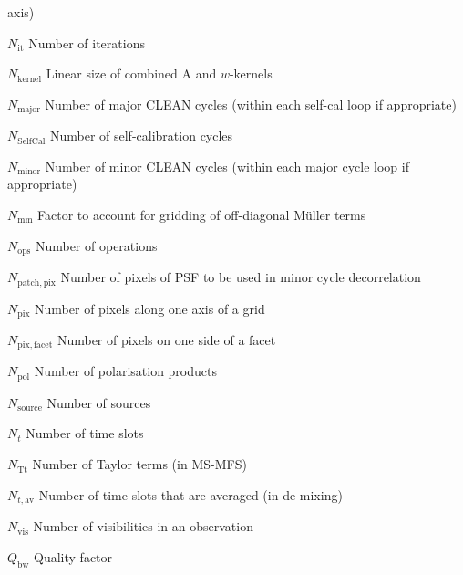 \documentclass[11pt,a4paper]{article}
\newcommand{\nit}{N_\mathrm{it}} %
\newcommand{\nawkern}{N_\mathrm{kernel}} %
\newcommand{\nmaj}{N_\mathrm{major}} %
\newcommand{\nmin}{N_\mathrm{minor}} %
\newcommand{\nselfcal}{N_\mathrm{SelfCal}} %
\newcommand{\facgridoffdiagmuller}{N_\mathrm{mm}} %
\newcommand{\nops}{N_\mathrm{ops}} %
\newcommand{\npatchpix}{N_\mathrm{patch,pix}} %
\newcommand{\npix}{N_\mathrm{pix}} %
\newcommand{\npixfacet}{N_\mathrm{pix,facet}} %
\newcommand{\npol}{N_\mathrm{pol}} %
\newcommand{\ntslot}{N_t} %
\newcommand{\ntaylor}{N_\mathrm{Tt}} %
\newcommand{\ntslotave}{N_{t,\mathrm{av}}} %
\newcommand{\nvis}{N_\mathrm{vis}} %
\newcommand{\qfacbw}{Q_\mathrm{bw}} %
\newcommand{\nsource}{N_\mathrm{source}} %
\newcommand{\w}{w} %
\begin{document}
\begin{basedescript}{\desclabelstyle{\pushlabel}\desclabelwidth{6em}}
  axis) \vspace{-0.2cm}
\item[$\nit$] Number of iterations \vspace{-0.2cm}
\item[$\nawkern$] Linear size of combined A and $\w$-kernels \vspace{-0.2cm}
\item[$\nmaj$] Number of major CLEAN cycles (within each self-cal loop if appropriate) \vspace{-0.2cm}
\item[$\nselfcal$] Number of self-calibration cycles \vspace{-0.2cm}
\item[$\nmin$] Number of minor CLEAN cycles (within each major cycle loop if appropriate)\vspace{-0.2cm}
\item[$\facgridoffdiagmuller$] Factor to account for gridding of off-diagonal
  M\"uller terms \vspace{-0.2cm}
\item[$\nops$] Number of operations \vspace{-0.2cm}
\item[$\npatchpix$] Number of pixels of PSF to be used in minor cycle
  decorrelation \vspace{-0.2cm}
\item[$\npix$] Number of pixels along one axis of a grid\vspace{-0.2cm}
\item[$\npixfacet$] Number of pixels on one side of a facet \vspace{-0.2cm}
\item[$\npol$] Number of polarisation products \vspace{-0.2cm}
\item[$\nsource$] Number of sources \vspace{-0.2cm}
\item[$\ntslot$] Number of time slots \vspace{-0.2cm}
\item[$\ntaylor$] Number of Taylor terms (in MS-MFS)\vspace{-0.2cm}
\item[$\ntslotave$] Number of time slots that are averaged (in de-mixing)
  \vspace{-0.2cm}
\item[$\nvis$] Number of visibilities in an observation \vspace{-0.2cm}
\item[$\qfacbw$] Quality factor \vspace{-0.2cm}

\end{basedescript}
\end{document}
